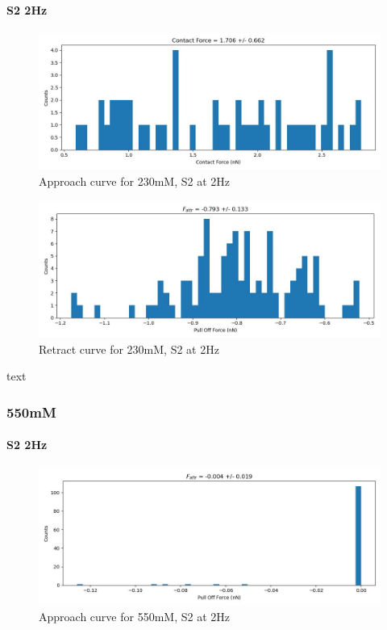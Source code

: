 \paragraph{S2 2Hz}
\begin{figure}[h!]
\centering
\includegraphics[width=\textwidth]{chapter7/Tip speed/230mM/S2 2Hz/approach_f_c_hist.jpg}
\caption{Approach curve for 230mM, S2 at 2Hz}
\end{figure}

\begin{figure}[h!]
\centering
\includegraphics[width=\textwidth]{chapter7/Tip speed/230mM/S2 2Hz/retract_f_a_hist.jpg}
\caption{Retract curve for 230mM, S2 at 2Hz}
\end{figure}
text
\newpage

\subsubsection*{550mM}
\paragraph{S2 2Hz}
\begin{figure}[h!]
\centering
\includegraphics[width=\textwidth]{chapter7/Tip speed/550mM/S2 2Hz/approach_f_a_hist.jpg}
\caption{Approach curve for 550mM, S2 at 2Hz}
\end{figure}


